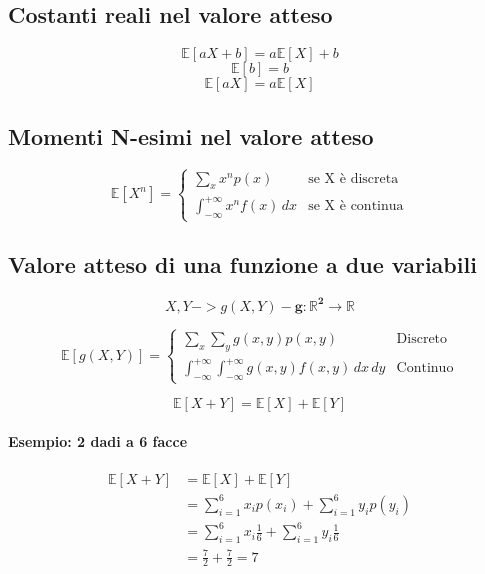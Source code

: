 \documentclass[]{article}
\newcommand{\ev}{\mathbb{E}[X]}
\renewcommand{\ev}[1]{\mathbb{E}[#1]}
\begin{document}
    \subsection{Costanti reali nel valore atteso}
    
    \[ \ev{aX+b} = a \ev{X} + b \]
    \[ \ev{b} = b \]
    \[ \ev{aX} = a \ev{X} \]

    \subsection{Momenti N-esimi nel valore atteso}
    \begin{equation*}
        \ev{X^n} =
        \begin{cases}
            \sum_{x}^{} x^n p(x) & \text{se X è discreta} \\
            \int_{-\infty}^{+\infty} x^n f(x) \, dx & \text{se X è continua}
        \end{cases}
    \end{equation*}

    \subsection{Valore atteso di una funzione a due variabili}
    \[ X, Y -> g(X,Y) - \boldsymbol{g: \mathbb{R}^2 \rightarrow \mathbb{R}} \]

    \begin{equation*}
        \ev{g(X,Y)} =
        \begin{cases}
            \sum_{x}^{} \sum_{y}^{} g(x,y) p(x,y) & \text{Discreto} \\
            \int_{-\infty}^{+\infty} \int_{-\infty}^{+\infty} g(x,y) f(x,y) \, dx \, dy & \text{Continuo}
        \end{cases}
    \end{equation*}
    \hfill 

    \begin{center}
        \[ \ev{X + Y} = \ev{X} + \ev{Y} \]
    \end{center}
    
    

    \paragraph{Esempio: 2 dadi a 6 facce}
    \begin{equation*}
      \begin{split}
        \ev{X + Y} & = \ev{X} + \ev{Y} \\
        & = \sum_{i = 1}^{6} x_i p(x_i) + \sum_{i = 1}^{6} y_i p(y_i) \\
        & = \sum_{i = 1}^{6} x_i \frac{1}{6} + \sum_{i = 1}^{6} y_i \frac{1}{6} \\
        & = \frac{7}{2} + \frac{7}{2} = 7 
      \end{split}  
    \end{equation*}
    
\end{document}
